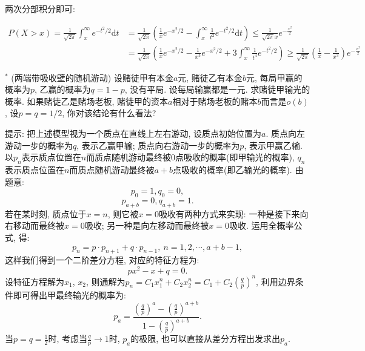 \documentclass[standard]{ExBook}
\begin{document}
\begin{qitems}
\begin{bbox}
两次分部积分即可:
\vspace{-2em}
\begin{center}
\begin{equation}
    \begin{array}{cl}
        \nonumber
        P(X>x)=\displaystyle\frac{1}{\sqrt{2\pi}}\int_{x}^{\infty}e^{-t^2/2}\mathrm{d}t &=\displaystyle\frac{1}{\sqrt{2\pi}}\left(\displaystyle\frac{1}{x}e^{-x^2/2}-\int_{x}^{\infty}\frac{1}{t^2}e^{-t^2/2}\mathrm{d}t\right) \leq \frac{1}{\sqrt{2\pi}x}e^{-\frac{x^2}{2}}\\
         &=\displaystyle\frac{1}{\sqrt{2\pi}}\left(\displaystyle\frac{1}{x}e^{-x^2/2}-\frac{1}{x^3}e^{-x^2/2}+3\int_{x}^{\infty}\frac{1}{t^4}e^{-t^2/2}\right) \geq \frac{1}{\sqrt{2\pi}}\left(\frac{1}{x}-\frac{1}{x^3}\right)e^{-\frac{x^2}{2}}
    \end{array}
\end{equation}
\end{center}
    \end{bbox}

\vspace{-5em}

    \begin{bbox}
    \begin{shaded}
        \qitem$^{*}$
(两端带吸收壁的随机游动) 设赌徒甲有本金$a$元, 赌徒乙有本金$b$元, 每局甲赢的概率为$p$, 乙赢的概率为$q = 1 - p$, 没有平局. 设每局输赢都是一元. 求赌徒甲输光的概率. 如果赌徒乙是赌场老板, 赌徒甲的资本$a$相对于赌场老板的赌本$b$而言是$o(b)$, 设$p = q = 1/2$, 你对该结论有什么看法?

提示: 把上述模型视为一个质点在直线上左右游动, 设质点初始位置为$a$. 质点向左游动一步的概率为$q$, 表示乙赢甲输; 质点向右游动一步的概率为$p$, 表示甲赢乙输. 以$p_{n}$表示质点位置在$n$而质点随机游动最终被0点吸收的概率(即甲输光的概率), $q_n$表示质点位置在$n$而质点随机游动最终被$a + b$点吸收的概率(即乙输光的概率). 由题意:
$$p_{0}=1,q_{0}=0,$$
$$p_{a+b}=0,q_{a+b}=1.$$
若在某时刻, 质点位于$x=n$, 则它被$x=0$吸收有两种方式来实现: 一种是接下来向右移动而最终被$x=0$吸收; 另一种是向左移动而最终被$x=0$吸收. 运用全概率公式, 得:
$$p_{n}=p\cdot p_{n+1}+q\cdot p_{n-1},\ n=1,2,\cdots,a+b-1,$$
这样我们得到一个二阶差分方程, 对应的特征方程为:
$$px^2-x+q=0.$$
设特征方程解为$x_{1}$, $x_{2}$, 则通解为$p_{n}=C_{1}x_{1}^{n}+C_{2}x_{2}^{n}=C_{1}+C_{2}\left(\frac{q}{p}\right)^{n}$, 利用边界条件即可得出甲最终输光的概率为:
$$p_{a}=\displaystyle\frac{\left(\frac{q}{p}\right)^{a}-\left(\frac{q}{p}\right)^{a+b}}{1-\left(\frac{q}{p}\right)^{a+b}}.$$
当$p=q=\frac{1}{2}$时, 考虑当$\frac{q}{p}\longrightarrow1$时, $p_{a}$的极限, 也可以直接从差分方程出发求出$p_{a}$.
    \end{shaded}
    \end{bbox}


\end{qitems}
\end{document}

